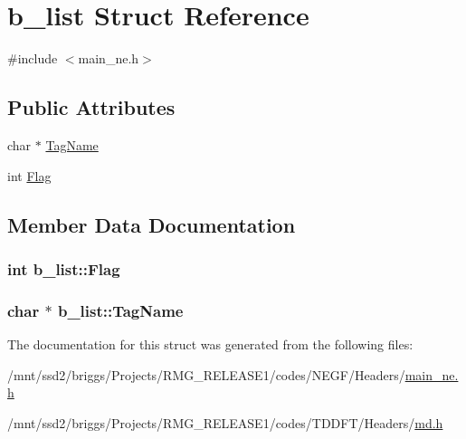 \hypertarget{structb__list}{\section{b\-\_\-list Struct Reference}
\label{structb__list}
}


{\ttfamily \#include $<$main\-\_\-ne.\-h$>$}

\subsection*{Public Attributes}
\begin{DoxyCompactItemize}
\item 
char $\ast$ \hyperlink{structb__list_a12f377464143ffa90f79e6c2ff0f27d5}{Tag\-Name}
\item 
int \hyperlink{structb__list_af307cc150c46681a964d394dc9f6e209}{Flag}
\end{DoxyCompactItemize}


\subsection{Member Data Documentation}
\hypertarget{structb__list_af307cc150c46681a964d394dc9f6e209}{
\subsubsection[{Flag}]{\setlength{\rightskip}{0pt plus 5cm}int b\-\_\-list\-::\-Flag}}\label{structb__list_af307cc150c46681a964d394dc9f6e209}
\hypertarget{structb__list_a12f377464143ffa90f79e6c2ff0f27d5}{
\subsubsection[{Tag\-Name}]{\setlength{\rightskip}{0pt plus 5cm}char $\ast$ b\-\_\-list\-::\-Tag\-Name}}\label{structb__list_a12f377464143ffa90f79e6c2ff0f27d5}


The documentation for this struct was generated from the following files\-:\begin{DoxyCompactItemize}
\item 
/mnt/ssd2/briggs/\-Projects/\-R\-M\-G\-\_\-\-R\-E\-L\-E\-A\-S\-E1/codes/\-N\-E\-G\-F/\-Headers/\hyperlink{main__ne_8h}{main\-\_\-ne.\-h}\item 
/mnt/ssd2/briggs/\-Projects/\-R\-M\-G\-\_\-\-R\-E\-L\-E\-A\-S\-E1/codes/\-T\-D\-D\-F\-T/\-Headers/\hyperlink{md_8h}{md.\-h}\end{DoxyCompactItemize}

